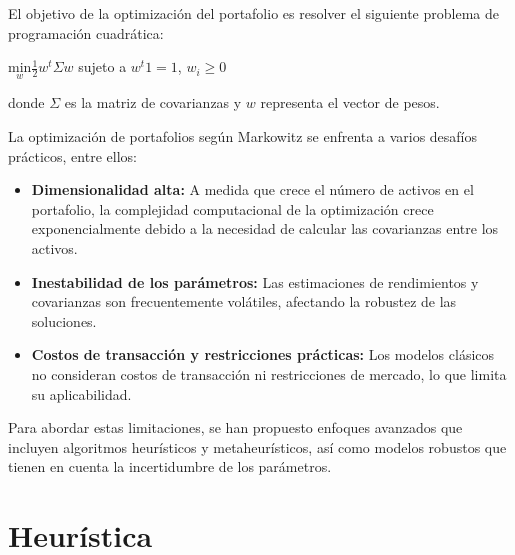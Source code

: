 \documentclass[9pt,a4paper,twoside]{rho-class/rho}
\begin{document}
            \vspace{2mm}El objetivo de la optimización del portafolio es resolver el siguiente problema de programación cuadrática:
        
            \begin{center}
                $\underset{w}{\mathrm{min}}\frac{1}{2}{w}^{t}\Sigma w$ sujeto a ${w}^{t}1=1$, ${w}_{i}\ge 0$     
            \end{center}
        
            \vspace{2mm}donde $\Sigma $ es la matriz de covarianzas y ${w}$ representa el vector de pesos.
        
            \vspace{2mm}La optimización de portafolios según Markowitz se enfrenta a varios desafíos prácticos, entre ellos:
        
            \begin{itemize}
                \item \textbf{Dimensionalidad alta:} A medida que crece el número de  activos en el portafolio, la complejidad computacional de la optimización crece exponencialmente debido a la necesidad de calcular las covarianzas entre los activos.
                \item \textbf{Inestabilidad de los parámetros:} Las estimaciones de rendimientos y covarianzas son frecuentemente volátiles, afectando la robustez de las soluciones.
                \item \textbf{Costos de transacción y restricciones prácticas:} Los modelos clásicos no consideran costos de transacción ni restricciones de mercado, lo que limita su aplicabilidad.
            \end{itemize}
        
            \noindent Para abordar estas limitaciones, se han propuesto enfoques avanzados que incluyen algoritmos heurísticos y metaheurísticos, así como modelos robustos que tienen en cuenta la incertidumbre de los parámetros.
    \section{Heurística}
\end{document}
